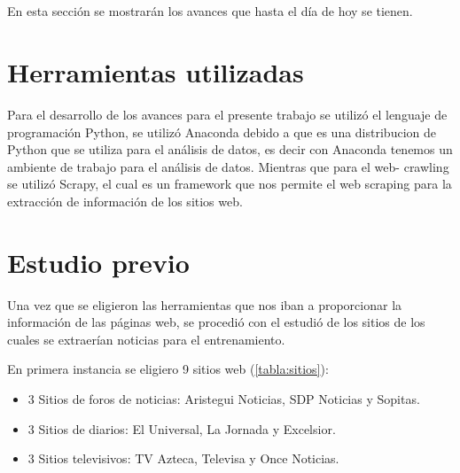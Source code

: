 \ \\\\
En esta sección se mostrarán los avances que hasta el día de hoy se tienen.

\section{Herramientas utilizadas}
Para el desarrollo de los avances para el presente trabajo se utilizó el lenguaje de programación Python, se utilizó Anaconda debido a que
es una distribucion de Python que se utiliza para el análisis de datos, es decir con Anaconda tenemos un ambiente de trabajo para el análisis 
de datos. Mientras que para el web- crawling se utilizó Scrapy, el cual es un framework que nos permite el web scraping para la extracción de 
información de los sitios web.

\section{Estudio previo}
Una vez que se eligieron las herramientas que nos iban a proporcionar la información de las páginas web, se procedió con el estudió de los 
sitios de los cuales se extraerían noticias para el entrenamiento.

En primera instancia se eligiero 9 sitios web (\ref{tabla:sitios}):

\begin{itemize}
    \item 3 Sitios de foros de noticias: Aristegui Noticias, SDP Noticias y Sopitas.
    \item 3 Sitios de diarios: El Universal, La Jornada y Excelsior.
    \item 3 Sitios televisivos: TV Azteca, Televisa y Once Noticias.
\end{itemize}


